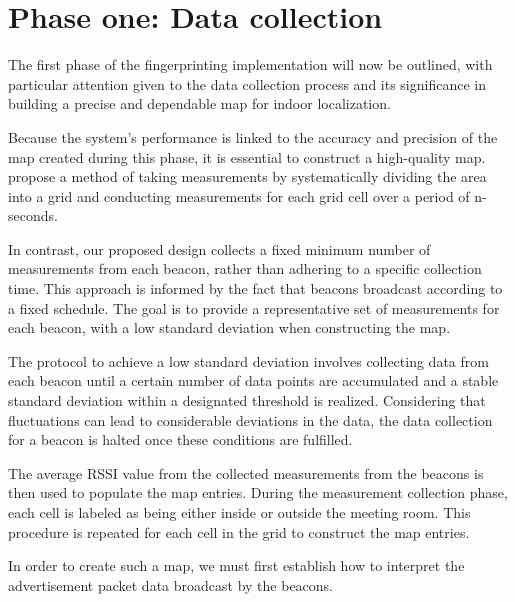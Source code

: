\section{Phase one: Data collection}\label{sec:first_phase}
The first phase of the fingerprinting implementation will now be outlined, with particular attention given to the data collection process and its significance in building a precise and dependable map for indoor localization.

Because the system's performance is linked to the accuracy and precision of the map created during this phase, it is essential to construct a high-quality map. 
\citeauthor{improving_indoor_localization}~\cite{improving_indoor_localization} propose a method of taking measurements by systematically dividing the area into a grid and conducting measurements for each grid cell over a period of n-seconds. 

In contrast, our proposed design collects a fixed minimum number of measurements from each beacon, rather than adhering to a specific collection time. This approach is informed by the fact that beacons broadcast according to a fixed schedule\cite{apple2023ibeacon}. The goal is to provide a representative set of measurements for each beacon, with a low standard deviation when constructing the map.

The protocol to achieve a low standard deviation involves collecting data from each beacon until a certain number of data points are accumulated and a stable standard deviation within a designated threshold is realized. Considering that fluctuations can lead to considerable deviations in the data, the data collection for a beacon is halted once these conditions are fulfilled.

The average RSSI value from the collected measurements from the beacons is then used to populate the map entries. During the measurement collection phase, each cell is labeled as being either inside or outside the meeting room. This procedure is repeated for each cell in the grid to construct the map entries.

In order to create such a map, we must first establish how to interpret the advertisement packet data broadcast by the beacons.